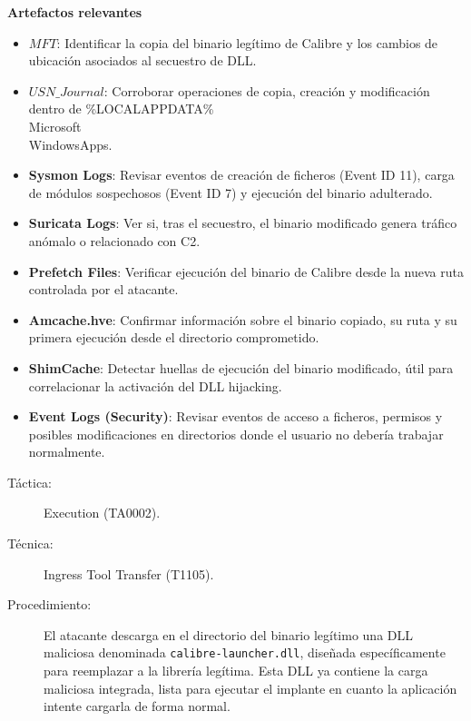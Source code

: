 \textbf{Artefactos relevantes}
\begin{itemize}
    \item \textbf{$MFT$}: Identificar la copia del binario legítimo de Calibre y los cambios de ubicación asociados al secuestro de DLL.
    \item \textbf{$USN\_Journal$}: Corroborar operaciones de copia, creación y modificación dentro de \%LOCALAPPDATA\%\\Microsoft\\WindowsApps.
    \item \textbf{Sysmon Logs}: Revisar eventos de creación de ficheros (Event ID 11), carga de módulos sospechosos (Event ID 7) y ejecución del binario adulterado.
    \item \textbf{Suricata Logs}: Ver si, tras el secuestro, el binario modificado genera tráfico anómalo o relacionado con C2.
    \item \textbf{Prefetch Files}: Verificar ejecución del binario de Calibre desde la nueva ruta controlada por el atacante.
    \item \textbf{Amcache.hve}: Confirmar información sobre el binario copiado, su ruta y su primera ejecución desde el directorio comprometido.
    \item \textbf{ShimCache}: Detectar huellas de ejecución del binario modificado, útil para correlacionar la activación del DLL hijacking.
    \item \textbf{Event Logs (Security)}: Revisar eventos de acceso a ficheros, permisos y posibles modificaciones en directorios donde el usuario no debería trabajar normalmente.
\end{itemize}

\begin{leftbar}
    \begin{description}
        \item[Táctica:] Execution (TA0002).
        \item[Técnica:] Ingress Tool Transfer (T1105).
        \item[Procedimiento:]  
        El atacante descarga en el directorio del binario legítimo una DLL maliciosa denominada \texttt{calibre-launcher.dll}, diseñada específicamente para reemplazar a la librería legítima. Esta DLL ya contiene la carga maliciosa integrada, lista para ejecutar el implante en cuanto la aplicación intente cargarla de forma normal.
    \end{description}
\end{leftbar}

